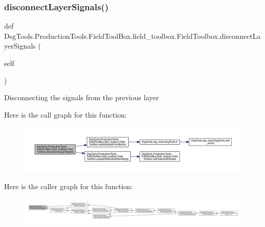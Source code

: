 \subsubsection{\texorpdfstring{disconnect\+Layer\+Signals()}{disconnectLayerSignals()}}
{\footnotesize\ttfamily def Dsg\+Tools.\+Production\+Tools.\+Field\+Tool\+Box.\+field\+\_\+toolbox.\+Field\+Toolbox.\+disconnect\+Layer\+Signals (\begin{DoxyParamCaption}\item[{}]{self }\end{DoxyParamCaption})}

\begin{DoxyVerb}Disconnecting the signals from the previous layer
\end{DoxyVerb}
 Here is the call graph for this function\+:
\nopagebreak
\begin{figure}[H]
\begin{center}
\leavevmode
\includegraphics[width=350pt]{class_dsg_tools_1_1_production_tools_1_1_field_tool_box_1_1field__toolbox_1_1_field_toolbox_a3b496b3d89e2edda903714b1485a50d4_cgraph}
\end{center}
\end{figure}
Here is the caller graph for this function\+:
\nopagebreak
\begin{figure}[H]
\begin{center}
\leavevmode
\includegraphics[width=350pt]{class_dsg_tools_1_1_production_tools_1_1_field_tool_box_1_1field__toolbox_1_1_field_toolbox_a3b496b3d89e2edda903714b1485a50d4_icgraph}
\end{center}
\end{figure}
\mbox{\label{class_dsg_tools_1_1_production_tools_1_1_field_tool_box_1_1field__toolbox_1_1_field_toolbox_aa7bb0c934bf00c2b283851933e9c7094}} 
